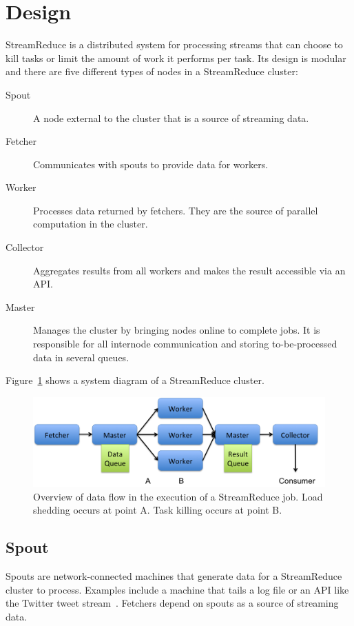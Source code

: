 \documentclass[12pt,twocolumn]{article}
\begin{document}
\section{Design}
\label{sec:design}
StreamReduce is a distributed system for processing streams that can choose to kill tasks or
limit the amount of work it performs per task. Its design is modular and there are five
different types of nodes in a StreamReduce cluster:
\begin{description}
  \item[Spout] A node external to the cluster that is a source of streaming data.
  \item[Fetcher] Communicates with spouts to provide data for workers.
  \item[Worker] Processes data returned by fetchers. They are the source of parallel
computation
    in the cluster.
  \item[Collector] Aggregates results from all workers and makes the result accessible via
an API.
  \item[Master] Manages the cluster by bringing nodes online to complete jobs. It is
responsible
    for all internode communication and storing to-be-processed data in several queues.
\end{description}
Figure~\ref{fig:systemdiagram} shows a system diagram of a StreamReduce cluster.

\begin{figure}
\includegraphics[width=\textwidth]{system-diagram.png}
\caption{Overview of data flow in the execution of a StreamReduce job. Load shedding
occurs at point A. Task killing occurs at point B.}
\label{fig:systemdiagram}
\end{figure}

\subsection{Spout}
Spouts are network-connected machines that generate data for a StreamReduce cluster to
process.
Examples include a machine that tails a log file or an API like the Twitter tweet
stream~\cite{twitter}. Fetchers depend on spouts as a source of streaming data.
\end{document}
